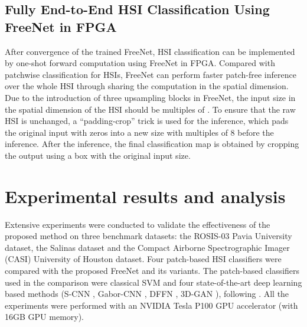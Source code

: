 \documentclass[journal]{IEEEtran}
\begin{document}
\subsection{Fully End-to-End HSI Classification Using FreeNet in FPGA}
After convergence of the trained FreeNet, HSI classification can be implemented by one-shot forward computation using FreeNet in FPGA.
Compared with patchwise classification for HSIs, FreeNet can perform faster patch-free inference over the whole HSI through sharing the computation in the spatial dimension.
Due to the introduction of three  upsampling blocks in FreeNet, the input size in the spatial dimension of the HSI should be multiples of .
To ensure that the raw HSI is unchanged, a ``padding-crop'' trick is used for the inference, which pads the original input with zeros into a new size with multiples of 8 before the inference.
After the inference, the final classification map is obtained by cropping the output using a box with the original input size.


\section{Experimental results and analysis}
\label{sec:exp}
Extensive experiments were conducted to validate the effectiveness of the proposed method on three benchmark datasets: the ROSIS-03 Pavia University dataset, the Salinas dataset and the Compact Airborne Spectrographic Imager (CASI) University of Houston dataset.
Four patch-based HSI classifiers were compared with the proposed FreeNet and its variants.
The patch-based classifiers used in the comparison were classical SVM \cite{melgani2004classification} and four state-of-the-art deep learning based methods (S-CNN \cite{liu2017supervised}, Gabor-CNN \cite{chen2017hyperspectral}, DFFN \cite{song2018hyperspectral}, 3D-GAN \cite{zhu2018generative}), following \cite{li2019deep}.
All the experiments were performed with an NVIDIA Tesla P100 GPU accelerator (with 16GB GPU memory).
\end{document}
